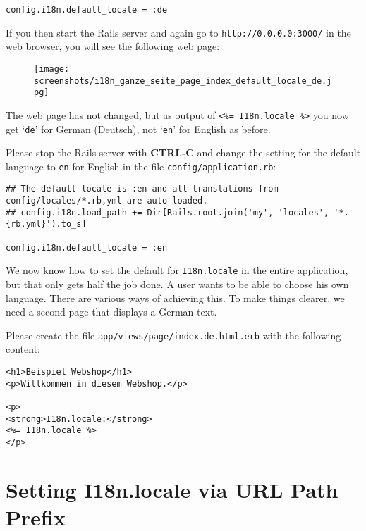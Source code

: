 \documentclass[a4paper]{book}
\newcommand{\chap}[1]{\newpage\thispagestyle{empty}\chapter{#1}\label{chap:\thechapter}}
\begin{document}
\begin{shaded}\begin{verbatim}
config.i18n.default_locale = :de
\end{verbatim}\end{shaded}

If you then start the Rails server and again go to \texttt{http://0.0.0.0:3000/} in the web browser, you will see the following web page:

\begin{figure}[htbp]
\centering
\texttt{[image: screenshots/i18n\_ganze\_seite\_page\_index\_default\_locale\_de.jpg]}
\end{figure}

The web page has not changed, but as output of \texttt{\textless{}\%=       I18n.locale \%\textgreater{}} you now get `\texttt{de}' for German (Deutsch), not `\texttt{en}' for English as before.

Please stop the Rails server with \textbf{CTRL-C} and change the setting for the default language to \texttt{en} for English in the file \texttt{config/application.rb}:

\begin{shaded}\begin{verbatim}
## The default locale is :en and all translations from config/locales/*.rb,yml are auto loaded.
## config.i18n.load_path += Dir[Rails.root.join('my', 'locales', '*.{rb,yml}').to_s]

config.i18n.default_locale = :en
\end{verbatim}\end{shaded}

We now know how to set the default for \texttt{I18n.locale} in the entire application, but that only gets half the job done. A user wants to be able to choose his own language. There are various ways of achieving this. To make things clearer, we need a second page that displays a German text.

Please create the file \texttt{app/views/page/index.de.html.erb} with the following content:

\begin{shaded}\begin{verbatim}
<h1>Beispiel Webshop</h1>
<p>Willkommen in diesem Webshop.</p>

<p>
<strong>I18n.locale:</strong>
<%= I18n.locale %>
</p>
\end{verbatim}\end{shaded}

\chap{Setting I18n.locale via URL Path Prefix}\label{setting-i18n.locale-via-url-path-prefix}
\end{document}
